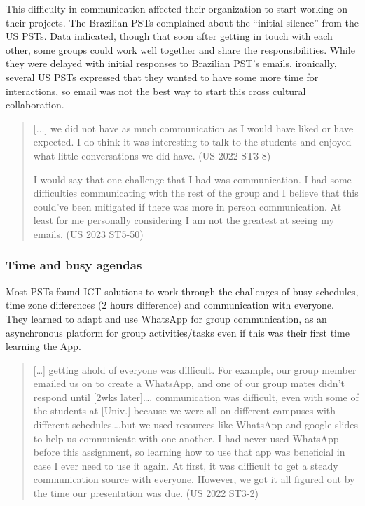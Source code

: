This difficulty in communication affected their organization to start
working on their projects. The Brazilian PSTs complained about the
\enquote{initial silence} from the US PSTs. Data indicated, though that soon
after getting in touch with each other, some groups could work well
together and share the responsibilities. While they were delayed with
initial responses to Brazilian PST's emails, ironically, several US PSTs
expressed that they wanted to have some more time for interactions, so
email was not the best way to start this cross cultural collaboration.
	
\begin{quote}
[$\ldots$] we did not have as much communication as I would have
liked or have expected. I do think it was interesting to talk to the
students and enjoyed what little conversations we did have. (US 2022
ST3-8)
		
I would say that one challenge that I had was communication. I had
some difficulties communicating with the rest of the group and I believe
that this could've been mitigated if there was more in person
communication. At least for me personally considering I am not the
greatest at seeing my emails. (US 2023 ST5-50)
\end{quote}
	
\subsubsection{Time and busy agendas}

Most PSTs found ICT solutions to work through the challenges of busy
schedules, time zone differences (2 hours difference) and communication
with everyone. They learned to adapt and use WhatsApp for group
communication, as an asynchronous platform for group activities/tasks
even if this was their first time learning the App.
	
\begin{quote}
[\ldots] getting ahold of everyone was difficult. For example,
our group member emailed us on to create a WhatsApp, and one of our
group mates didn't respond until [2wks later]\ldots. communication
was difficult, even with some of the students at [Univ.] because we
were all on different campuses with different schedules\ldots.but we
used resources like WhatsApp and google slides to help us communicate
with one another. I had never used WhatsApp before this assignment, so
learning how to use that app was beneficial in case I ever need to use
it again. At first, it was difficult to get a steady communication
source with everyone. However, we got it all figured out by the time our
presentation was due. (US 2022 ST3-2)
\end{quote}
	

